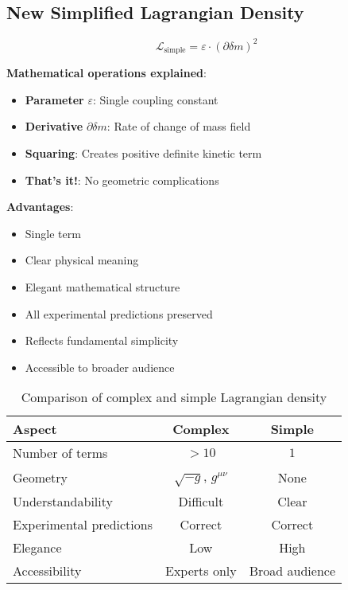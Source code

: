 \documentclass[12pt,a4paper]{article}
\newcommand{\deltam}{\delta m}
\newcommand{\Lag}{\mathcal{L}}
\theoremstyle{definition}
\theoremstyle{remark}
\begin{document}
	\subsection{New Simplified Lagrangian Density}
	
	\begin{equation}
		\boxed{\Lag_{\text{simple}} = \varepsilon \cdot (\partial \deltam)^2}
	\end{equation}
	
	\textbf{Mathematical operations explained}:
	\begin{itemize}
		\item \textbf{Parameter} $\varepsilon$: Single coupling constant
		\item \textbf{Derivative} $\partial \deltam$: Rate of change of mass field
		\item \textbf{Squaring}: Creates positive definite kinetic term
		\item \textbf{That's it!}: No geometric complications
	\end{itemize}
	
	\textbf{Advantages}:
	\begin{itemize}
		\item Single term
		\item Clear physical meaning
		\item Elegant mathematical structure
		\item All experimental predictions preserved
		\item Reflects fundamental simplicity
		\item Accessible to broader audience
	\end{itemize}
	
	\begin{table}[htbp]
		\centering
		\begin{tabular}{lcc}
			\toprule
			\textbf{Aspect} & \textbf{Complex} & \textbf{Simple} \\
			\midrule
			Number of terms & $>10$ & $1$ \\
			Geometry & $\sqrt{-g}$, $g^{\mu\nu}$ & None \\
			Understandability & Difficult & Clear \\
			Experimental predictions & Correct & Correct \\
			Elegance & Low & High \\
			Accessibility & Experts only & Broad audience \\
			\bottomrule
		\end{tabular}
		\caption{Comparison of complex and simple Lagrangian density}
		\label{tab:complexity_comparison}
	\end{table}
	
\end{document}
